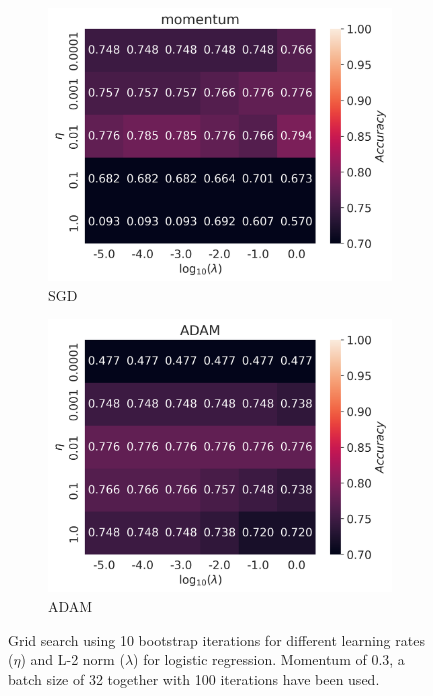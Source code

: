 \documentclass[11pt]{article}
\begin{document}
\begin{figure}[H]
    \begin{subfigure}{.5\textwidth}
        \centering
        \includegraphics[width=\textwidth]{../figures/logreg_momentum_Cobar_bootstrap.png}
        \caption{SGD}
        \label{fig:}
    \end{subfigure}
    \begin{subfigure}{.5\textwidth}
        \centering
        \includegraphics[width=\textwidth]{../figures/logreg_ADAM_Cobar_bootstrap.png}
        \caption{ADAM}
        \label{fig:}
    \end{subfigure}
    \caption{Grid search using 10 bootstrap iterations for different learning rates ($\eta$) and L-2 norm ($\lambda$) for logistic regression. Momentum of 0.3, a batch size of 32 together with 100 iterations have been used.}
    \label{fig:cobar_grid_logreg}
\end{figure}
\end{document}
